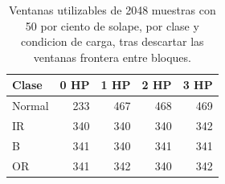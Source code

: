 \begin{table}[htbp]
\centering
\caption{Ventanas utilizables de 2048 muestras con 50 por ciento de solape, por clase y condicion de carga, tras descartar las ventanas frontera entre bloques.}
\label{tab:ventanas}
\begin{tabular}{lrrrr}
\toprule
Clase & 0 HP & 1 HP & 2 HP & 3 HP \\
\midrule
Normal & 233 & 467 & 468 & 469 \\
IR & 340 & 340 & 340 & 342 \\
B & 341 & 340 & 341 & 341 \\
OR & 341 & 342 & 340 & 342 \\
\bottomrule
\end{tabular}
\end{table}
